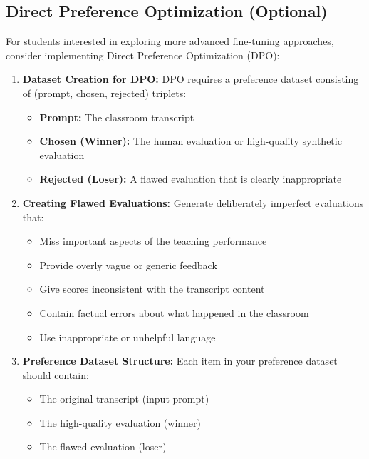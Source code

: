 \documentclass[11pt]{article}
\begin{document}
\subsection{Direct Preference Optimization (Optional)}

For students interested in exploring more advanced fine-tuning approaches, consider implementing Direct Preference Optimization (DPO):

\begin{enumerate}
    \item \textbf{Dataset Creation for DPO:} DPO requires a preference dataset consisting of (prompt, chosen, rejected) triplets:
    \begin{itemize}
        \item \textbf{Prompt:} The classroom transcript
        \item \textbf{Chosen (Winner):} The human evaluation or high-quality synthetic evaluation
        \item \textbf{Rejected (Loser):} A flawed evaluation that is clearly inappropriate
    \end{itemize}
    
    \item \textbf{Creating Flawed Evaluations:} Generate deliberately imperfect evaluations that:
    \begin{itemize}
        \item Miss important aspects of the teaching performance
        \item Provide overly vague or generic feedback
        \item Give scores inconsistent with the transcript content
        \item Contain factual errors about what happened in the classroom
        \item Use inappropriate or unhelpful language
    \end{itemize}
    
    \item \textbf{Preference Dataset Structure:} Each item in your preference dataset should contain:
    \begin{itemize}
        \item The original transcript (input prompt)
        \item The high-quality evaluation (winner)
        \item The flawed evaluation (loser)
    \end{itemize}
    

\end{enumerate}
\end{document}
